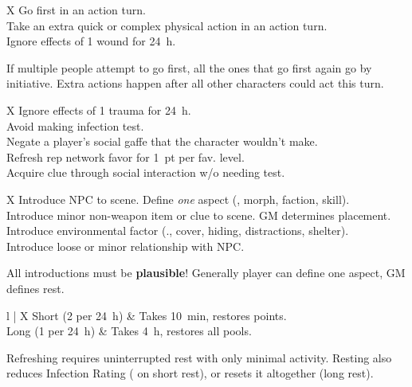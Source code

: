 \bigskip



\begin{eptable}{ X }
   Go first in an action turn.\\
   Take an extra quick or complex physical action in an action turn.\\
   Ignore effects of \num{1} wound for \SI{24}{h}.\\
\end{eptable}

If multiple people attempt to go first, all the ones that go first
again go by initiative. Extra actions happen after all other characters
could act this turn.

\bigskip

\begin{eptable}{ X }
   Ignore effects of \num{1} trauma for \SI{24}{h}.\\
   Avoid making infection test.\\
   Negate a player’s social gaffe that the character wouldn’t make.\\
   Refresh rep network favor for \SI{1}{pt} per fav. level.\\
   Acquire clue through social interaction w/o needing test.\\
\end{eptable}




\bigskip



\begin{eptable}{ X }
   Introduce NPC to scene. Define \textit{one} aspect (\eg, morph, faction, skill).\\
   Introduce minor non-weapon item or clue to scene. GM determines placement.\\
   Introduce environmental factor (\eg., cover, hiding, distractions, shelter).\\
   Introduce loose or minor relationship with NPC.\\
\end{eptable}

All introductions must be \textbf{plausible}! Generally player
can define one aspect, GM defines rest.

\bigskip


\begin{eptable}{ l | X }
   Short (2 per \SI{24}{h}) & Takes \SI{10}{min}, restores  points.\\
   Long (1 per \SI{24}{h}) & Takes \SI{4}{h}, restores all pools.\\
\end{eptable}

\begin{itemize}
    \itembox Refreshing requires uninterrupted rest with only minimal activity.
    \itembox Resting also reduces Infection Rating ( on short rest), or resets it altogether (long rest).
\end{itemize}
